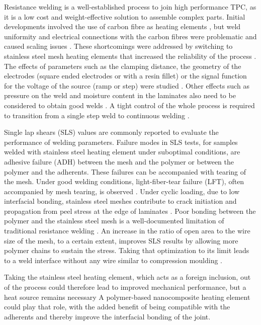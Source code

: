 \documentclass[11pt,review,times]{elsarticle}
\begin{document}
Resistance welding is a well-established process to join high performance TPC, as it is a low cost and weight-effective solution to assemble complex parts. 
Initial developments involved the use of carbon fibre as heating elements \cite{Ageorges2000a,houghton1984bonding,Eveno1988}, but weld uniformity and electrical connections with the carbon fibres were problematic and caused scaling issues \cite{McKnight1997}. 
These shortcomings were addressed by switching to stainless steel mesh heating elements that increased the reliability of the process \cite{Hou1999a}. 
The effects of parameters such as the clamping distance, the geometry of the electrodes (square ended electrodes or with a resin fillet) or the signal function for the voltage of the source (ramp or step) were studied \cite{Dube2007}. 
Other effects such as pressure on the weld and moisture content in the laminates also need to be considered to obtain good welds \cite{Shi2014}. 
A tight control of the whole process is required to transition from a single step weld to continuous welding \cite{Shi2015a}. 

Single lap shears (SLS) values are commonly reported to evaluate the performance of welding parameters. 
Failure modes in SLS tests, for samples welded with stainless steel heating element under suboptimal conditions, are adhesive failure (ADH) between the mesh and the polymer or between the polymer and the adherents. 
These failures can be accompanied with tearing of the mesh. 
Under good welding conditions, light-fiber-tear failure (LFT), often accompanied by mesh tearing, is observed \cite{Shi2014}. 
Under cyclic loading, due to low interfacial bonding, stainless steel meshes contribute to crack initiation and propagation from peel stress at the edge of laminates \cite{Dube2009a}. 
Poor bonding between the polymer and the stainless steel mesh is a well-documented limitation of traditional resistance welding \cite{Dube2007,Dube2012a,Dube2009a,Shi2014,Shi2015a}. 
An increase in the ratio of open area to the wire size of the mesh, to a certain extent, improves SLS results by allowing more polymer chains to sustain the stress. 
Taking that optimization to its limit leads to a weld interface without any wire similar to compression moulding \cite{Dube2012a}. 

Taking the stainless steel heating element, which acts as a foreign inclusion, out of the process could therefore lead to improved mechanical performance, but a heat source remains necessary
A polymer-based nanocomposite heating element could play that role, with the added benefit of being compatible with the adherents and thereby improve the interfacial bonding of the joint. 
\end{document}
